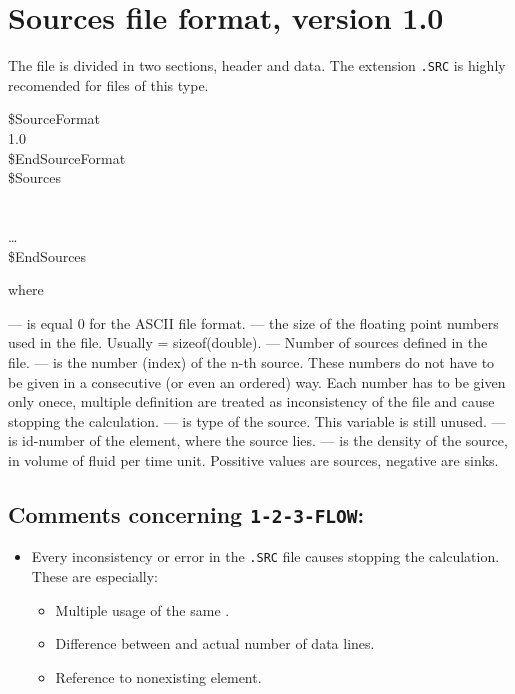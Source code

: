
\section*{Sources file format, version 1.0}
The file is divided in two sections, header and data.
The extension {\tt .SRC} is highly recomended for files of this type.
\begin{fileformat}
\$SourceFormat\\
  1.0  \\
\$EndSourceFormat\\
\$Sources\\
  \\
     \\
  \dots\\
\$EndSources\\
\end{fileformat}
where
\begin{description}
  --- is equal 0 for the ASCII file format.
  --- the size of the floating point numbers used in
  the file. Usually  = sizeof(double).
  --- Number of sources defined in the
  file.
  --- is the number (index) of the n-th
  source. These numbers do not have to be given in a consecutive (or even an
  ordered) way. Each number has to be given only onece, multiple definition
  are treated as inconsistency of the file and cause stopping the
  calculation.
  --- is type of the source. This variable is still unused. 
  --- is id-number of the element, where the source lies.
  --- is the density of the source, in volume of fluid
   per time unit. Possitive values are sources, negative are sinks.
\end{description}
\subsection*{Comments concerning {\tt 1-2-3-FLOW}:}
\begin{itemize}
  \item Every inconsistency or error in the {\tt .SRC} file causes stopping
    the calculation. These are especially:
    \begin{itemize}
      \item Multiple usage of the same .
      \item Difference between  and actual number
        of data lines.
      \item Reference to nonexisting element.
    \end{itemize}
\end{itemize}
